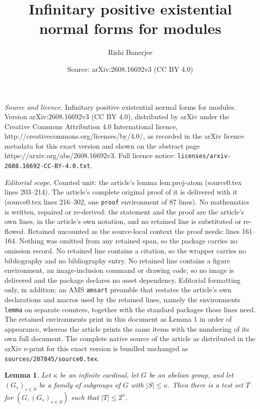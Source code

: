 \documentclass[10pt,a4paper]{amsart}
\title{Infinitary positive existential normal forms for modules}
\author{Rishi Banerjee}
\date{Source: arXiv:2608.16692v3 (CC BY 4.0)}
\newtheorem{lemma}{Lemma}
\begin{document}
\maketitle

\noindent\emph{Source and licence.} Infinitary positive existential normal forms for modules. Version arXiv:2608.16692v3 (CC BY 4.0), distributed by arXiv under the Creative Commons Attribution 4.0 International licence, http://creativecommons.org/licenses/by/4.0/, as recorded in the arXiv licence metadata for this exact version and shown on the abstract page https://arxiv.org/abs/2608.16692v3. Full licence notice: \texttt{licenses/arxiv-2608.16692-CC-BY-4.0.txt}.\par\smallskip

\noindent\textit{Editorial scope.} Counted unit: the article's lemma lem:proj-atom (source0.tex lines 203--214). The article's complete original proof of it is delivered with it (source0.tex lines 216--302, one \texttt{proof} environment of 87 lines). No mathematics is written, repaired or re-derived: the statement and the proof are the article's own lines, in the article's own notation, and no retained line is substituted or re-flowed.  Retained uncounted as the source-local context the proof needs: lines 161--164.  Nothing was omitted from any retained span, so the package carries no omission record.  No retained line contains a citation, so the wrapper carries no bibliography and no bibliography entry.  No retained line contains a figure environment, an image-inclusion command or drawing code, so no image is delivered and the package declares no asset dependency.  Editorial formatting only, in addition: an AMS \texttt{amsart} preamble that restates the article's own declarations and macros used by the retained lines, namely the environments \texttt{lemma} on separate counters, together with the standard packages those lines need.  The retained environments print in this document as Lemma 1 in order of appearance, whereas the article prints the same items with the numbering of its own full document.  The complete native source of the article as distributed in the arXiv e-print for this exact version is bundled unchanged as \texttt{sources/207845/source0.tex}.
\begin{lemma}
\label{lem:test-set}
    Let $\kappa$ be an infinite cardinal, let $G$ be an abelian group, and let $(G_s)_{s \in S}$ be a family of subgroups of $G$ with $|S| \leq \kappa$. Then there is a test set $T$ for $(G, (G_s)_{s \in S})$ such that $|T| \leq 2^\kappa$.
\end{lemma}
\end{document}
